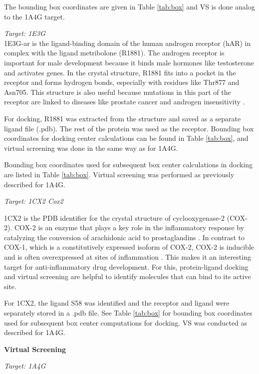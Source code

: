 \documentclass[a4paper,10pt]{article}
\begin{document}
The bounding box coordinates are given in Table \ref{tab:box} and VS is done analog to the 1A4G target.

\textit{Target: 1E3G} \\
1E3G-ar is the ligand-binding domain of the human androgen receptor (hAR) in complex with the ligand metribolone (R1881). The androgen receptor is important for male development because it binds male hormones like testosterone and activates genes. In the crystal structure, R1881 fits into a pocket in the receptor and forms hydrogen bonds, especially with residues like Thr877 and Asn705. This structure is also useful because mutations in this part of the receptor are linked to diseases like prostate cancer and androgen insensitivity \cite{matiasStructuralEvidenceLigand200}.

For docking, R1881 was extracted from the structure and saved as a separate ligand file (.pdb). The rest of the protein was used as the receptor. Bounding box coordinates for docking center calculations can be found in Table \ref{tab:box}, and virtual screening was done in the same way as for 1A4G.

Bounding box coordinates used for subsequent box center calculations in docking are listed in Table \ref{tab:box}. Virtual screening was performed as previously described for 1A4G.

\textit{Target: 1CX2 Cox2}

1CX2 is the PDB identifier for the crystal structure of cyclooxygenase-2 (COX-2). COX-2 is an enzyme that plays a key role in the inflammatory response by catalyzing the conversion of arachidonic acid to prostaglandins \cite{1CX2}. In contrast to COX-1, which is a constitutively expressed isoform of COX-2, COX-2 is inducible and is often overexpressed at sites of inflammation \cite{1CX2_2}. This makes it an interesting target for anti-inflammatory drug development. For this, protein-ligand docking and virtual screening are helpful to identify molecules that can bind to its active site. 

For 1CX2, the ligand S58 was identified and the receptor and ligand were separately stored in a .pdb file. See Table \ref{tab:box} for bounding box coordinates used for subsequent box center computations for docking. VS was conducted as described for 1A4G.





\textbf{Virtual Screening}

\textit{Target: 1A4G}
\end{document}
